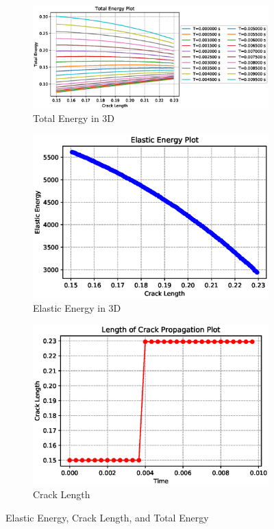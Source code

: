 \documentclass[a4paper,11pt]{article}
\begin{document}
\begin{figure}[h!]
	\begin{subfigure}[b]{\linewidth}
		\centering
		\includegraphics[width=\linewidth]{picture/conference/totalenergy3d}
		\caption{Total Energy in 3D}
		\label{fig:totalenergy3d}
	\end{subfigure}
	\quad
	\begin{subfigure}[b]{0.49\linewidth}
		\centering
		\includegraphics[width=\linewidth]{picture/conference/elastic3d}
		\caption{Elastic Energy in 3D}
		\label{fig:elastic3d}
	\end{subfigure}
	\quad
	\begin{subfigure}[b]{0.49\linewidth}
		\centering
		\includegraphics[width=\linewidth]{picture/conference/cracklength3d}
		\caption{Crack Length}
		\label{fig:cracklength3d}
	\end{subfigure}
	\caption{Elastic Energy, Crack Length, and Total Energy}
	\label{fig:crack3d}
\end{figure}
\end{document}

